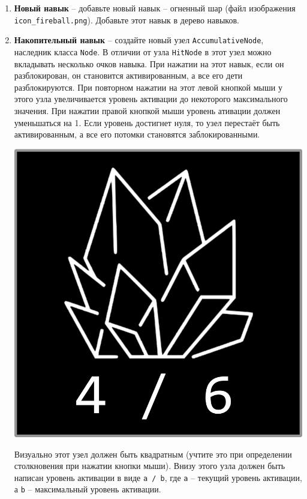 \documentclass{article}
\begin{document}
\begin{enumerate}
\item \textbf{Новый навык} -- добавьте новый навык -- огненный шар (файл изображения \texttt{icon\_fireball.png}). Добавьте этот навык в дерево навыков.

\item \textbf{Накопительный навык} -- создайте новый узел \texttt{AccumulativeNode}, наследник класса \texttt{Node}. В отличии от узла \texttt{HitNode} в этот узел можно вкладывать несколько очков навыка.  При нажатии на этот навык, если он разблокирован, он становится активированным, а все его дети разблокируются. При повторном нажатии на этот левой кнопкой мыши у этого узла увеличивается уровень активации до некоторого максимального значения. При нажатии правой кнопкой мыши уровень ативации должен уменьшаться на 1. Если уровень достигнет нуля, то узел перестаёт быть активированным, а все его потомки становятся заблокированными.

\begin{center}
\includegraphics[scale=0.3]{../images/freeze.png}
\end{center}

Визуально этот узел должен быть квадратным (учтите это при определении столкновения при нажатии кнопки мыши). Внизу этого узла должен быть написан уровень активации в виде \texttt{a / b}, где \texttt{a} -- текущий уровень активации, а \texttt{b} -- максимальный уровень активации.


\end{enumerate}
\end{document}
